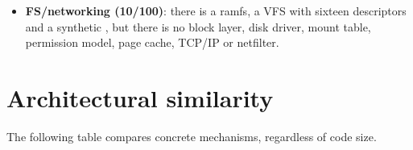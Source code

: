 \begin{itemize}
        blocking  with  semantics, event
        wait queues with / and
        , Unix-style signals with pending/blocked masks,
        dispositions and default actions, stopped/continued tasks, exit
        status, zombies, / and twelve syscalls;
        there is no /, separate address spaces,
        real-time classes or a full CFS/EEVDF red--black tree.
  \item \textbf{FS/networking (10/100)}: there is a ramfs, a VFS with sixteen
        descriptors and a synthetic , but there is no block layer,
        disk driver, mount table, permission model, page cache, TCP/IP or
        netfilter.
\end{itemize}

\section{Architectural similarity}

The following table compares concrete mechanisms, regardless of code size.

